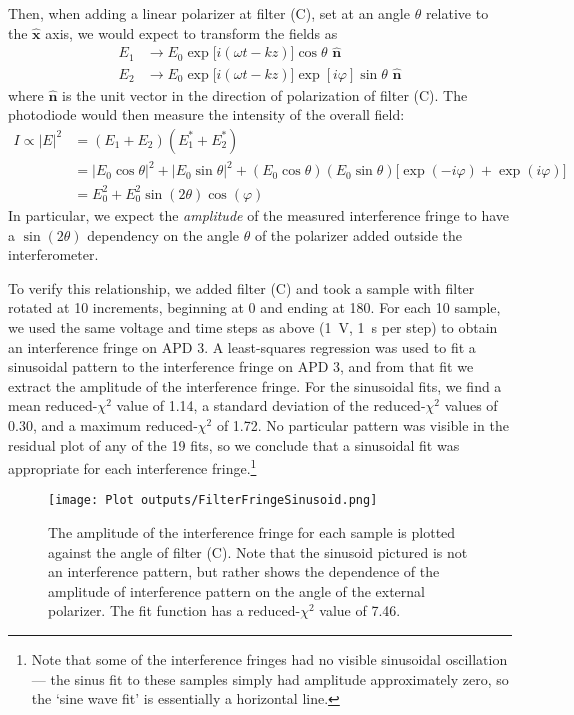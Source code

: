 \documentclass[letter]{article}
\newcommand{\BVEC}[1]{\hat{\mathbf{#1}}}
\begin{document}
Then, when adding a linear polarizer at filter (C), set at an angle $\theta$ relative to the $\BVEC{x}$ axis, we would expect to transform the fields as
\begin{align}
E_1 &\to E_0 \exp \big[ i (\omega t - kz) \big] \cos\theta \,\, \BVEC{n} \\
E_2 &\to E_0 \exp \big[ i (\omega t - kz) \big] \exp[i\varphi] \sin\theta \,\, \BVEC{n}
\end{align}
where $\BVEC{n}$ is the unit vector in the direction of polarization of filter (C). The photodiode would then measure the intensity of the overall field:
\begin{align}
I \propto |E|^2 
&=
(E_1 + E_2) (E_1^\ast + E_2^\ast)
\\&=
|E_0 \cos\theta|^2 + |E_0 \sin\theta|^2 + (E_0 \cos\theta)(E_0 \sin\theta) \big[ \exp(-i\varphi) + \exp(i \varphi) \big]
\\&= \label{eqn:sin2theta}
E_0^2 + E_0^2 \sin(2\theta) \cos(\varphi)
\end{align}
In particular, we expect the \textit{amplitude} of the measured interference fringe to have a $\sin(2\theta)$ dependency on the angle $\theta$ of the polarizer added outside the interferometer.

To verify this relationship, we added filter (C) and took a sample with filter rotated at \qty{10}{\deg} increments, beginning at \qty{0}{\deg} and ending at \qty{180}{\deg}. For each \qty{10}{\deg} sample, we used the same voltage and time steps as above (\qty{1}{\volt}, \qty{1}{\s} per step) to obtain an interference fringe on APD 3. A least-squares regression was used to fit a sinusoidal pattern to the interference fringe on APD 3, and from that fit we extract the amplitude of the interference fringe. For the sinusoidal fits, we find a mean reduced-$\chi^2$ value of 1.14, a standard deviation of the reduced-$\chi^2$ values of 0.30, and a maximum reduced-$\chi^2$ of 1.72. No particular pattern was visible in the residual plot of any of the 19 fits, so we conclude that a sinusoidal fit was appropriate for each interference fringe.\footnote{Note that some of the interference fringes had no visible sinusoidal oscillation --- the sinus fit to these samples simply had amplitude approximately zero, so the `sine wave fit' is essentially a horizontal line.}

\newpage
\begin{figure}[h]\centering
    \texttt{[image: Plot outputs/FilterFringeSinusoid.png]}
    \caption{The amplitude of the interference fringe for each sample is plotted against the angle of filter (C). Note that the sinusoid pictured is not an interference pattern, but rather shows the dependence of the amplitude of interference pattern on the angle of the external polarizer. The fit function has a reduced-$\chi^2$ value of 7.46.}
    \label{fig:amplitudeFit}
\end{figure}
\end{document}
